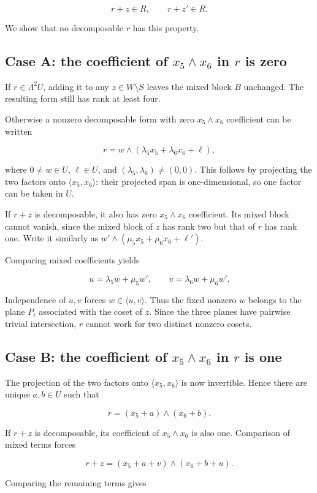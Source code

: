 \[r+z\in R,\qquad r+z'\in R.\]

We show that no decomposable $r$ has this property.

\subsection*{Case A: the coefficient of $x_5\wedge x_6$ in $r$ is zero}

If $r\in\Lambda^2U$, adding it to any $z\in W\setminus S$ leaves the mixed block $B$ unchanged. The resulting form still has rank at least four.

Otherwise a nonzero decomposable form with zero $x_5\wedge x_6$ coefficient can be written

\[r=w\wedge(\lambda_5x_5+\lambda_6x_6+\ell),\]

where $0\ne w\in U$, $\ell\in U$, and $(\lambda_5,\lambda_6)\ne(0,0)$. This follows by projecting the two factors onto $\langle x_5,x_6\rangle$: their projected span is one-dimensional, so one factor can be taken in $U$.

If $r+z$ is decomposable, it also has zero $x_5\wedge x_6$ coefficient. Its mixed block cannot vanish, since the mixed block of $z$ has rank two but that of $r$ has rank one. Write it similarly as $w'\wedge(\mu_5x_5+\mu_6x_6+\ell')$.

Comparing mixed coefficients yields

\[u=\lambda_5w+\mu_5w',\qquad v=\lambda_6w+\mu_6w'.\]

Independence of $u,v$ forces $w\in\langle u,v\rangle$. Thus the fixed nonzero $w$ belongs to the plane $P_i$ associated with the coset of $z$. Since the three planes have pairwise trivial intersection, $r$ cannot work for two distinct nonzero cosets.

\subsection*{Case B: the coefficient of $x_5\wedge x_6$ in $r$ is one}

The projection of the two factors onto $\langle x_5,x_6\rangle$ is now invertible. Hence there are unique $a,b\in U$ such that

\[r=(x_5+a)\wedge(x_6+b).\]

If $r+z$ is decomposable, its coefficient of $x_5\wedge x_6$ is also one. Comparison of mixed terms forces

\[r+z=(x_5+a+v)\wedge(x_6+b+u).\]

Comparing the remaining terms gives

